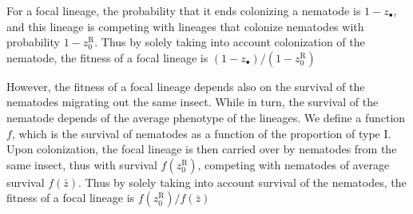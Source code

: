 \documentclass[10pt]{article}
\begin{document}
\begin{multicols}{2}
For a focal lineage, the probability that it ends colonizing a nematode is $1-z_\bullet$, and this lineage is competing with lineages that colonize nematodes with probability $1-z_0^{\mathrm{R}}$. Thus by solely taking into account colonization of the nematode, the fitness of a focal lineage is $(1- z_\bullet)/(1-z_0^{\mathrm{R}})$

However, the fitness of a focal lineage depends also on the survival of the nematodes migrating out the same insect.
While in turn, the survival of the nematode depends of the average phenotype of the lineages. 
We define a function $f$, which is the survival of nematodes as a function of the proportion of type I.
Upon colonization, the focal lineage is then carried over by nematodes from the same insect, thus with survival $f(z_0^{\mathrm{R}})$, competing with nematodes of average survival $f( \bar{z} )$. Thus by solely taking into account survival of the nematodes, the fitness of a focal lineage is $f(z_0^{\mathrm{R}})/f(\bar{z})$


\end{multicols}
\end{document}
